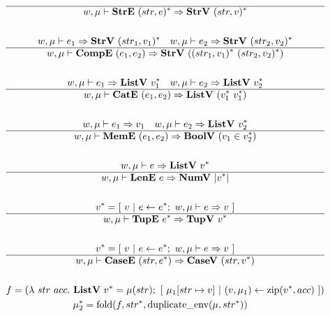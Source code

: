 \begin{gather*}
  \hline
  w, \mu \vdash \stre ~ \seq{(str, e)} \Rightarrow \strv ~ \seq{(str, v)} \\
%
\newline \\
   w, \mu \vdash e_1 \Rightarrow \strv ~ \seq{(str_1, v_1)} \quad
   w, \mu \vdash e_2 \Rightarrow \strv ~ \seq{(str_2, v_2)} \\
  \hline
  w, \mu \vdash \compe ~ (e_1, e_2) \Rightarrow \strv ~ (\seq{(str_1, v_1)} ~ \seq{(str_2, v_2)}) \\
%
\newline \\
   w, \mu \vdash e_1 \Rightarrow \listv ~ \seq{v_1} \quad
   w, \mu \vdash e_2 \Rightarrow \listv ~ \seq{v_2} \\
  \hline
  w, \mu \vdash \cate ~ (e_1, e_2) \Rightarrow \listv ~ (\seq{v_1} ~ \seq{v_1}) \\
%
\newline \\
  w, \mu \vdash e_1 \Rightarrow v_1 \quad
  w, \mu \vdash e_2 \Rightarrow \listv ~ \seq{v_2} \\
  \hline
  w, \mu \vdash \meme ~ (e_1, e_2) \Rightarrow \boolv ~ (v_1 \in \seq{v_2}) \\
%
\newline \\
  w, \mu \vdash e \Rightarrow \listv ~ \seq{v} \\
  \hline
  w, \mu \vdash \lene ~ e \Rightarrow \numv ~ |\seq v| \\
%
\newline \\
  \seq{v} = [ ~ v ~ | ~ e \leftarrow \seq{e}; ~ w, \mu \vdash e \Rightarrow v ~ ] \\
  \hline
  w, \mu \vdash \tupe ~ \seq{e} \Rightarrow \tupv ~ \seq{v} \\
%
\newline \\
  \seq{v} = [ ~ v ~ | ~ e \leftarrow \seq{e}; ~ w, \mu \vdash e \Rightarrow v ~ ] \\
  \hline
  w, \mu \vdash \casee ~ (str, \seq{e}) \Rightarrow \casev ~ (str, \seq{v}) \\
%
\newline \\
  f =
    (\lambda ~ str ~ acc. ~
      \listv ~ \seq v = \mu(str); ~
      [ ~ \mu_1[str \mapsto v] ~ | ~ (v, \mu_1) \leftarrow \zip (\seq v, acc) ~ ]
    )
  \\
  \seq{\mu_2} = \fold(f, \seq{str}, \duplicateenv(\mu, \seq{str})) \quad

\end{gather*}
